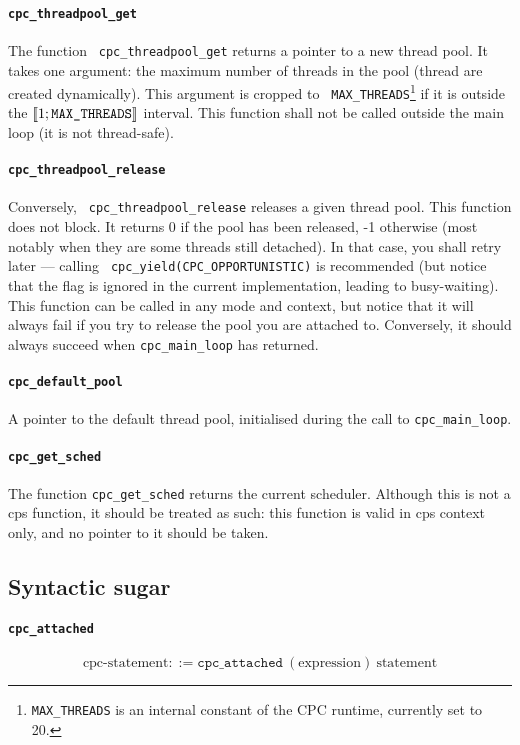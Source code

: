 \documentclass[a4paper]{report}
\begin{document}
\paragraph{\tt cpc\_threadpool\_get} The function {\tt
cpc\_threadpool\_get} returns a pointer to a new thread pool.  It takes
one argument: the maximum number of threads in the pool (thread are
created dynamically).  This argument is cropped to {\tt
MAX\_THREADS}\footnote{{\tt MAX\_THREADS} is an internal constant of the
CPC runtime, currently set to 20.} if it is outside the $\llbracket 1;
\mbox{\tt MAX\_THREADS}\rrbracket$ interval.  This function shall not be
called outside the main loop (it is not thread-safe).

\paragraph{\tt cpc\_threadpool\_release} Conversely, {\tt
cpc\_threadpool\_release} releases a given thread pool.  This function
does not block.  It returns 0 if the pool has been released, -1
otherwise (most notably when they are some threads still detached).  In
that case, you shall retry later --- calling {\tt
cpc\_yield(CPC\_OPPORTUNISTIC)} is recommended (but notice that the flag
is ignored in the current implementation, leading to busy-waiting).
This function can be called in any mode and context, but notice that it
will always fail if you try to release the pool you are attached to.
Conversely, it should always succeed when {\tt cpc\_main\_loop} has
returned.

\paragraph{\tt cpc\_default\_pool} A pointer to the default thread pool,
initialised during the call to {\tt cpc\_main\_loop}.

\paragraph{\tt cpc\_get\_sched} The function {\tt cpc\_get\_sched} returns
the current scheduler.  Although this is not a cps function, it should
be treated as such: this function is valid in cps context only, and no
pointer to it should be taken.

\subsection*{Syntactic sugar}
\paragraph{\tt cpc\_attached}
\[ \mbox{cpc-statement} ::=
   \mathtt{cpc\_attached}\ (\mbox{expression})\ \mbox{statement} \]
\end{document}
